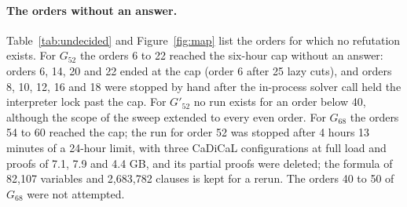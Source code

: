 \documentclass[11pt]{article}
\theoremstyle{definition}
\theoremstyle{remark}
\newcommand{\Ga}{G_{52}}
\newcommand{\Gb}{G'_{52}}
\newcommand{\Gsix}{G_{68}}
\begin{document}
\paragraph{The orders without an answer.} Table~\ref{tab:undecided} and Figure~\ref{fig:map} list the orders for which no refutation exists. For $\Ga$ the orders 6 to 22 reached the six-hour cap without an answer: orders 6, 14, 20 and 22 ended at the cap (order 6 after 25 lazy cuts), and orders 8, 10, 12, 16 and 18 were stopped by hand after the in-process solver call held the interpreter lock past the cap. For $\Gb$ no run exists for an order below 40, although the scope
of the sweep extended to every even order. For $\Gsix$ the orders 54 to 60 reached the cap; the run for order 52 was stopped after 4 hours 13 minutes of a 24-hour limit, with three CaDiCaL configurations at full load and proofs of 7.1, 7.9 and 4.4 GB, and its partial proofs were deleted; the formula of 82{,}107 variables and 2{,}683{,}782 clauses is kept for a rerun. The orders 40 to 50 of $\Gsix$ were not attempted.
\end{document}
